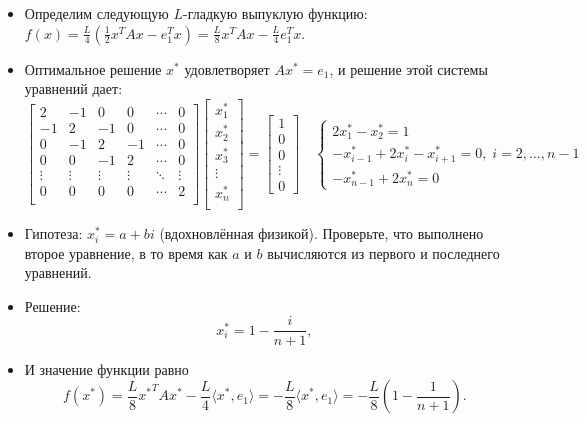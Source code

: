 \documentclass[
  russian,
  letterpaper,
  DIV=11,
  numbers=noendperiod]{scrartcl}
\begin{document}
\begin{itemize}
\item
  Определим следующую \(L\)-гладкую выпуклую функцию:
  \(f(x) = \frac{L}{4}\left(\frac{1}{2} x^T A x - e_1^T x \right) = \frac{L}{8} x^T A x - \frac{L}{4} e_1^T x.\)
\item
  Оптимальное решение \(x^*\) удовлетворяет \(Ax^* = e_1\), и решение
  этой системы уравнений дает: \[
    \begin{bmatrix}
        2 & -1 & 0 & 0 & \cdots & 0 \\
        -1 & 2 & -1 & 0 & \cdots & 0 \\
        0 & -1 & 2 & -1  & \cdots & 0 \\
        0 & 0 & -1 & 2  & \cdots & 0 \\
        \vdots & \vdots & \vdots & \vdots & \ddots & \vdots \\
        0 & 0 & 0 & 0 & \cdots & 2  \\
    \end{bmatrix} \begin{bmatrix}
        x_1^* \\
        x_2^* \\
        x_3^* \\
        \vdots \\
        x_{n}^* \\
    \end{bmatrix} = \begin{bmatrix} 1 \\ 0 \\ 0 \\ \vdots \\ 0 \end{bmatrix} \quad \begin{cases} 2x_1^* - x_2^* = 1 \\ -x_{i-1}^* + 2x_{i}^* - x_{i+1}^* = 0, \; i = 2, \ldots, n-1 \\ -x_{n-1}^* + 2x_n^* = 0 \end{cases}
    \]
\item
  Гипотеза: \(x_i^* = a+bi\) (вдохновлённая физикой). Проверьте, что
  выполнено второе уравнение, в то время как \(a\) и \(b\) вычисляются
  из первого и последнего уравнений.
\item
  Решение: \[
    x^*_i = 1 - \frac{i}{n+1},
    \]
\item
  И значение функции равно \[
    f(x^*) =  \frac{L}{8} {x^*}^T A x^* - \frac{L}{4}\langle x^*, e_1 \rangle = -\frac{L}{8} \langle x^*, e_1 \rangle = -\frac{L}{8} \left(1 - \frac{1}{n+1}\right).
    \]
\end{itemize}
\end{document}
